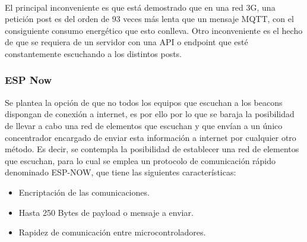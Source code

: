 \documentclass[paper=a4, fontsize=11pt,twoside]{scrartcl}	%
\begin{document}
\begin{enumerate}
            \paragraph{}
            El principal inconveniente es que está demostrado que en una red 3G, una petición post es del orden de 93 veces
            más lenta que un mensaje MQTT, con el consiguiente consumo energético que esto conlleva. Otro inconveniente es el hecho 
            de que se requiera de un servidor con una API o endpoint que esté constantemente escuchando a los distintos posts.
        \subsubsection {ESP Now}
            Se plantea la opción de que no todos los equipos que escuchan a los beacons dispongan de conexión a internet, es por ello
            por lo que se baraja la posibilidad de llevar a cabo una red de elementos que escuchan y que envían a un único concentrador encargado de enviar
            esta información a internet por cualquier otro método.
            Es decir, se contempla la posibilidad de establecer una red de elementos que escuchan, para lo cual se emplea 
            un protocolo de comunicación rápido denominado ESP-NOW, que tiene las siguientes características:
            \begin{itemize}
                \item Encriptación de las comunicaciones.
                \item Hasta 250 Bytes de payload o mensaje a enviar.
                \item Rapidez de comunicación entre microcontroladores.
            \end{itemize}

\end{enumerate}
\end{document}
